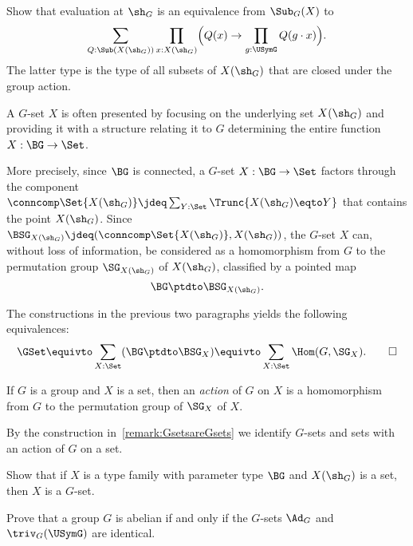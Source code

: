 \begin{xca}\label{xca:SubGX-closedSubXshG}
Show that evaluation at $\sh_G$ is an equivalence from $\Sub_G(X)$ to
\[
  \sum_{Q:\Sub(X(\sh_G))}
  \prod_{x:X(\sh_G)}
  \Bigl(Q(x)\to\prod_{g:\USymG} Q(g\cdot x)\Bigr).
\]
The latter type is the type of all
subsets of $X(\sh_G)$ that are closed under the group action.
\end{xca}

\begin{remark}
  \label{remark:GsetsareGsets}
  A $G$-set $X$ is often presented by focusing on the underlying set $X(\sh_G)$
  and providing it with a structure relating it to $G$ determining
  the entire function $X : \BG\to\Set$.

  More precisely, since $\BG$ is connected, a $G$-set $X : \BG\to\Set$ factors
  through the component
  $\conncomp \Set {X(\sh_G)} \jdeq \sum_{Y:\Set}\Trunc{X(\sh_G) \eqto Y}$
  that contains the point $X(\sh_G)$.
  Since $\BSG_{X(\sh_G)}\jdeq(\conncomp \Set {X(\sh_G)},X(\sh_G))$,
  the $G$-set $X$ can,
  without loss of information, be considered as a homomorphism from $G$ to
  the permutation group $\SG_{X(\sh_G)}$ of $X(\sh_G)$,
  classified by a pointed map
  \[
    \BG\ptdto\BSG_{X(\sh_G)}.
  \]

  The constructions in the previous two paragraphs yields the following equivalences:
  \[
    \GSet \equivto \sum_{X:\Set} (\BG \ptdto \BSG_X)
     \equivto \sum_{X:\Set}\Hom(G,\SG_X).\qedhere
   \]
\end{remark}

\begin{definition}\label{def:Gaction}
  If $G$ is a group and $X$ is a set, then an \emph{action}
  of $G$ on $X$
  is a homomorphism from $G$ to the permutation group of $\SG_X$ of $X$.%
\end{definition}
By the construction in~\cref{remark:GsetsareGsets} we identify $G$-sets
and sets with an action of $G$ on a set.

\begin{xca}
Show that if $X$ is a type family with parameter type $\BG$ and $X(\sh_G)$ is a set,
then $X$ is a $G$-set.
\end{xca}

\begin{xca}\label{xca:Ad-triv-abelian}
  Prove that a group $G$ is abelian if and only if the $G$-sets $\Ad_G$ and
  $\triv_G(\USymG)$ are identical.
\end{xca}

